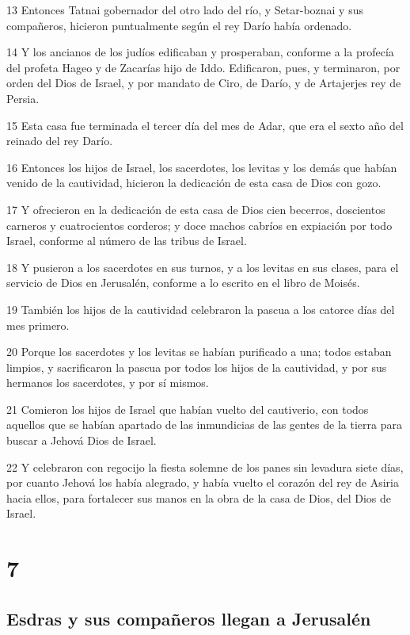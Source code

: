 \par 13 Entonces Tatnai gobernador del otro lado del río, y Setar-boznai y sus compañeros, hicieron puntualmente según el rey Darío había ordenado.
\par 14 Y los ancianos de los judíos edificaban y prosperaban, conforme a la profecía del profeta Hageo y de Zacarías hijo de Iddo. Edificaron, pues, y terminaron, por orden del Dios de Israel, y por mandato de Ciro, de Darío, y de Artajerjes rey de Persia.
\par 15 Esta casa fue terminada el tercer día del mes de Adar, que era el sexto año del reinado del rey Darío.
\par 16 Entonces los hijos de Israel, los sacerdotes, los levitas y los demás que habían venido de la cautividad, hicieron la dedicación de esta casa de Dios con gozo.
\par 17 Y ofrecieron en la dedicación de esta casa de Dios cien becerros, doscientos carneros y cuatrocientos corderos; y doce machos cabríos en expiación por todo Israel, conforme al número de las tribus de Israel.
\par 18 Y pusieron a los sacerdotes en sus turnos, y a los levitas en sus clases, para el servicio de Dios en Jerusalén, conforme a lo escrito en el libro de Moisés.
\par 19 También los hijos de la cautividad celebraron la pascua a los catorce días del mes primero. 
\par 20 Porque los sacerdotes y los levitas se habían purificado a una; todos estaban limpios, y sacrificaron la pascua por todos los hijos de la cautividad, y por sus hermanos los sacerdotes, y por sí mismos.
\par 21 Comieron los hijos de Israel que habían vuelto del cautiverio, con todos aquellos que se habían apartado de las inmundicias de las gentes de la tierra para buscar a Jehová Dios de Israel.
\par 22 Y celebraron con regocijo la fiesta solemne de los panes sin levadura siete días, por cuanto Jehová los había alegrado, y había vuelto el corazón del rey de Asiria hacia ellos, para fortalecer sus manos en la obra de la casa de Dios, del Dios de Israel.

\chapter{7}

\section*{Esdras y sus compañeros llegan a Jerusalén}

